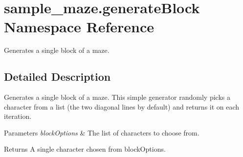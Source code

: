 \hypertarget{namespacesample__maze_1_1generate_block}{\section{sample\-\_\-maze.\-generate\-Block Namespace Reference}
\label{namespacesample__maze_1_1generate_block}
}


Generates a single block of a maze.  




\subsection{Detailed Description}
Generates a single block of a maze. This simple generator randomly picks a character from a list (the two diagonal lines by default) and returns it on each iteration.


\begin{DoxyParams}{Parameters}
{\em block\-Options} & The list of characters to choose from.\\
\hline
\end{DoxyParams}
\begin{DoxyReturn}{Returns}
A single character chosen from block\-Options. 
\end{DoxyReturn}
